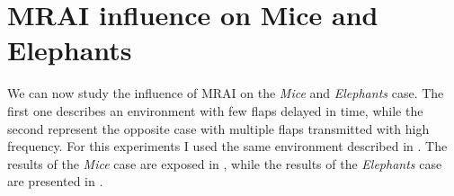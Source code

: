 %

\section{MRAI influence on Mice and Elephants}
\label{sec:bgp_rfd_mrai_influence_mice_elephants}

We can now study the influence of \ac{MRAI} on the \textit{Mice} and \textit{Elephants}
case.
The first one describes an environment with few flaps delayed in time, while the
second represent the opposite case with multiple flaps transmitted with high
frequency.
For this experiments I used the same environment described in .
The results of the \textit{Mice} case are exposed in ,
while the results of the \textit{Elephants} case are presented in .


